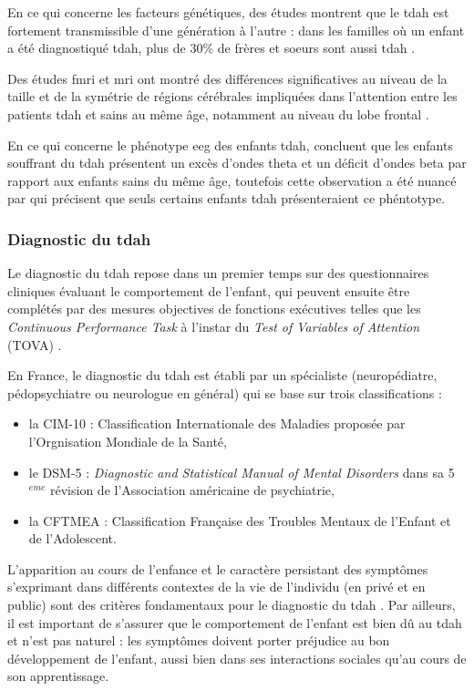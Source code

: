 En ce qui concerne les facteurs génétiques, des études montrent que le \gls{tdah} est fortement transmissible d'une génération à l'autre :
dans les familles où un enfant a été diagnostiqué \gls{tdah}, plus de 30\% de frères et soeurs sont aussi \gls{tdah} \citep{Monastra2005}.

Des études \gls{fmri} et \gls{mri} ont montré des différences significatives au niveau de la taille et de la symétrie de régions cérébrales impliquées
dans l'attention entre les patients \gls{tdah} et sains au même âge, notamment au niveau du lobe frontal \citep{Monastra2005}.  

En ce qui concerne le phénotype \gls{eeg} des enfants \gls{tdah}, \citet{Lubar1991} concluent que les enfants souffrant du \gls{tdah} présentent un excès 
d'ondes theta et un déficit d'ondes beta par rapport aux enfants sains du même âge, toutefois cette observation a été nuancé par \citep{Arns2012} qui précisent
que seuls certains enfants \gls{tdah} présenteraient ce phéntotype. 

\subsubsection{Diagnostic du \gls{tdah}}

Le diagnostic du \gls{tdah} repose dans un premier temps sur des questionnaires cliniques évaluant le comportement de l'enfant, qui peuvent ensuite être
complétés par des mesures objectives de fonctions exécutives telles que les \textit{Continuous Performance Task} \citep{Barkley1991} à l'instar du 
\textit{Test of Variables of Attention} (TOVA) \citep{Forbes1998}.

En France, le diagnostic du \gls{tdah} est établi par un spécialiste (neuropédiatre, pédopsychiatre ou neurologue en général) qui se base sur trois classifications \citep{HAS} :
\begin{itemize}
\item la CIM-10 : Classification Internationale des Maladies proposée par l'Orgnisation Mondiale de la Santé,
\item le DSM-5 : \textit{Diagnostic and Statistical Manual of Mental Disorders} dans sa 5$^{eme}$ révision de l'Association américaine de
psychiatrie,
\item la CFTMEA : Classification Française des Troubles Mentaux de l'Enfant et de l'Adolescent.
\end{itemize}

L'apparition au cours de l'enfance et le caractère persistant des symptômes s'exprimant dans différents contextes de la vie de l'individu (en privé et 
en public) sont des critères fondamentaux pour le diagnostic du \gls{tdah} \citep{HAS}. Par ailleurs, il est important de s'assurer que le comportement de
l'enfant est bien dû au \gls{tdah} et n'est pas naturel : les symptômes doivent porter préjudice au bon développement de l'enfant, aussi bien dans ses
interactions sociales qu'au cours de son apprentissage. 

